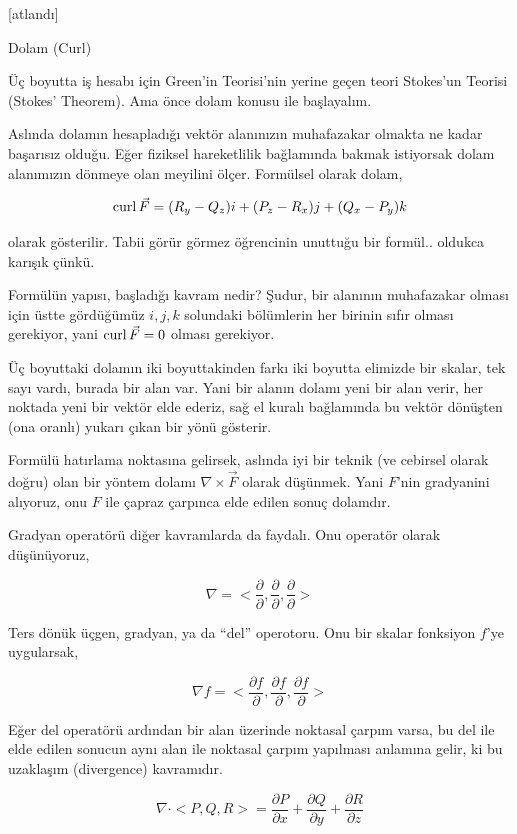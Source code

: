 \documentclass[12pt,fleqn]{article}\usepackage{../../common}
\begin{document}
[atlandı]

Dolam (Curl)

Üç boyutta iş hesabı için Green'in Teorisi'nin yerine geçen teori Stokes'un
Teorisi (Stokes' Theorem). Ama önce dolam konusu ile başlayalım.

Aslında dolamın hesapladığı vektör alanınızın muhafazakar olmakta ne kadar
başarısız olduğu. Eğer fiziksel hareketlilik bağlamında bakmak istiyorsak
dolam alanımızın dönmeye olan meyilini ölçer. Formülsel olarak dolam,

$$
\operatorname{curl} \vec{F} = (R_y - Q_z) i + (P_z - R_x) j + (Q_x - P_y) k
$$

olarak gösterilir. Tabii görür görmez öğrencinin unuttuğu bir formül..
oldukca karışık çünkü.

Formülün yapısı, başladığı kavram nedir? Şudur, bir alanının muhafazakar olması
için üstte gördüğümüz $i,j,k$ solundaki bölümlerin her birinin sıfır olması
gerekiyor, yani $\operatorname{curl} \vec{F} = 0$ olması gerekiyor.

Üç boyuttaki dolamın iki boyuttakinden farkı iki boyutta elimizde bir skalar,
tek sayı vardı, burada bir alan var. Yani bir alanın dolamı yeni bir alan verir,
her noktada yeni bir vektör elde ederiz, sağ el kuralı bağlamında bu vektör
dönüşten (ona oranlı) yukarı çıkan bir yönü gösterir. 

Formülü hatırlama noktasına gelirsek, aslında iyi bir teknik (ve cebirsel olarak
doğru) olan bir yöntem dolamı $\nabla \times \vec{F}$ olarak düşünmek. Yani
$F$'nin gradyanini alıyoruz, onu $F$ ile çapraz çarpınca elde edilen sonuç
dolamdır. 

Gradyan operatörü diğer kavramlarda da faydalı. Onu operatör olarak düşünüyoruz,

$$
\nabla = < \frac{\partial }{\partial },
           \frac{\partial }{\partial },
           \frac{\partial }{\partial } >
$$

Ters dönük üçgen, gradyan, ya da ``del'' operotoru. Onu bir skalar fonksiyon
$f$'ye uygularsak,

$$
\nabla f = < \frac{\partial f}{\partial },
             \frac{\partial f}{\partial },
             \frac{\partial f}{\partial } >
$$

Eğer del operatörü ardından bir alan üzerinde noktasal çarpım varsa, bu del
ile elde edilen sonucun aynı alan ile noktasal çarpım yapılması anlamına
gelir, ki bu uzaklaşım (divergence) kavramıdır.

$$
\nabla \cdot < P,Q,R > =
\frac{\partial P}{\partial x} +
\frac{\partial Q}{\partial y} +
\frac{\partial R}{\partial z}
$$
\end{document}
